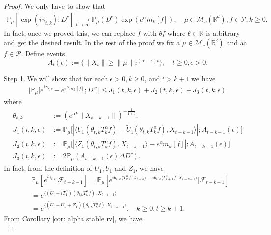 \documentclass[12pt,oneside,english]{amsart}
\theoremstyle{plain}
\theoremstyle{definition}
\numberwithin{equation}{section}
\begin{document}
 \begin{proof}
	We only have to show that
\begin{align}
    \mathbb{P}_{\mu}[\exp(i\gamma_{t,k}); D^c]
    \xrightarrow[t\rightarrow \infty]{}\mathbb{P}_{\mu}(D^c)\exp(e^{\alpha}m_k[f]),
    \quad \mu \in \mathcal M_c(\mathbb R^d), f\in \mathcal P, k \geq 0.
\end{align}
	In fact, once we proved this, we can replace $f$ with $\theta f$ where $\theta \in \mathbb R$ is arbitrary and get the desired result.
	In the rest of the proof we fix a $\mu \in \mathcal M_c(\mathbb R^d)$ and an $f\in \mathcal P$.
	Define events
\[
	A_t(\epsilon):=\{ \|X_t\| \geq \|\mu\|e^{(\alpha - \epsilon)t} \},\quad t\geq 0, \epsilon > 0.
\]
	
	Step 1. We will show that for each $\epsilon > 0, k\geq 0$, and $t>k+1$ we have
\begin{align}
    \big|\mathbb{P}_{\mu}\big[e^{i\gamma_{t,k}}-e^{e^{\alpha}m_k[f]}; D^c\big]\big|
    \leq J_1(t,k,\epsilon)+J_2(t,k,\epsilon)+J_3(t,k,\epsilon)
\end{align}
	where
\begin{align}
\label{eq: Def of Ji}
	\theta_{t,k}
	&:= (e^{\alpha k}\|X_{t-k-1}\|)^{-\frac{1}{1+\beta}},
	\\ J_1(t,k,\epsilon)
	&:= \mathbb{P}_{\mu}\big[|\langle U_1(\theta_{t,k}T_k^{\alpha}f)-\tilde U_1(\theta_{t,k}T_k^{\alpha}f), X_{t-k-1}\rangle|; A_{t-k-1}(\epsilon) \big]
	\\ J_2(t,k,\epsilon)
	&:= \mathbb{P}_{\mu}\big[|\langle Z_1(\theta_{t,k}T_k^{\alpha}f),X_{t-k-1}\rangle-e^{\alpha}m_k[f]|; A_{t-k-1}(\epsilon)\big]
	\\ J_3(t,k, \epsilon)
	&:=2\mathbb{P}_{\mu}(A_{t-k-1}(\epsilon)\Delta D^c).
\end{align}
In fact, from the definition of $U_1, \tilde U_1$ and $Z_1$, we have
\begin{align}
\label{eq: need1}
    &\mathbb{P}_{\mu}[e^{i\gamma_{t,k}}|\mathscr{F}_{t-k-1}]
    =\mathbb{P}_{\mu}[e^{i\theta_{t,k}\langle T_k^{\alpha}f,X_{t-k}\rangle-i\theta_{t,k}\langle T_{k+1}^{\alpha}f, X_{t-k-1}\rangle}|\mathscr{F}_{t-k-1}]
    \\&=e^{\langle (U_1 - iT_{1}^{\alpha}) (\theta_{t,k}T_k^{\alpha}f),X_{t-k-1}\rangle}
    \\&=e^{\langle (U_1 - \tilde U_1+Z_1) (\theta_{t,k}T_k^{\alpha}f),X_{t-k-1}\rangle},
    \quad k\geq 0, t\geq k+1.
\end{align}
	From Corollary \ref{cor: alpha stable rv}, we have
\begin{equation}

\end{equation}
\end{proof}
\end{document}
